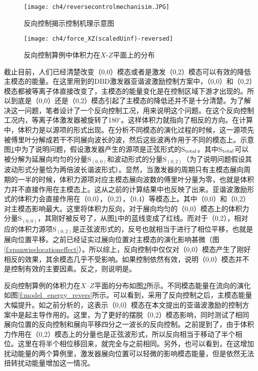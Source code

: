 \begin{figure}[htb]
  \centering
  \texttt{[image: ch4/reversecontrolmechanisim.JPG]}
  \caption{反向控制揭示控制机理示意图}\label{f:reversecontrolmechanisim}
\end{figure}
\begin{figure}[htb]
\centering
\texttt{[image: ch4/force\_XZ(scaledUinf)-reversed]}
\caption{反向控制算例中体积力在$X$-$Z$平面上的分布}%
\label{f:force_reversed}
\end{figure}

截止目前，人们已经清楚改变（0,0）模态\cite{dorr2016}或者是激发（0,2）模态\cite{Saric1998}可以有效的降低主模态的能量。在这里用到的DBD激发器亚谐波激励控制方案中，（0,0）和（0,2）模态都被等离子体直接改变了，主模态的能量变化是在控制区域下游才出现的。所以到底是（0,0）还是（0,2）模态引起了主模态的降低还并不是十分清楚。为了解决这一问题，笔者设计了一个反向控制工况，用来说明这个问题。在这个反向控制工况内，等离子体激发器被旋转了180$^\circ$。这样体积力就指向了相反的方向。在计算中，体积力是以源项的形式出现。在分析不同模态的演化过程的时候，这一源项先被傅里叶分解成若干不同展向波长的波，然后这些波再作用于不同的模态上。示意图\ref{f:reversecontrolmechanisim}中为了说明问题，假设激发器产生的源项是正弦形式的S$_{\rm total}$。其中S$_{\rm total}$可以被分解为延展向均匀的分量S$_{(0,0)}$和波动形式的分量S$_{(0,2)}$（为了说明问题假设其波动形式分量恰为两倍波长谐波形式）。显然，当激发器的周期只有主模态展向周期的一半的时候，体积力源项对应主模态展向波数的傅里叶分量为零，也就是体积力并不直接作用在主模态上。这从之前的计算结果中也反映了出来。亚谐波激励形式的体积力会直接作用在（0,0），（0,2），（0,4）等模态上。其中（0,0）和（0,2）对主模态影响最大。这里将体积力反向，对于展向均匀的（0,0）模态上的体积力分量S$_{(0,0)}$，其刚好被反号了，从图\ref{f:reversecontrolmechanisim}中的蓝线变成了红线。而对于（0,2），相对应的体积力源项S$_ {(0,2)}$是正弦波形式的，反号也就相当于进行了相位平移，也就是展向位置平移。之前已经证实过展向位置对主模态的演化影响甚微（图\ref{f:spanwiselocationeffect}）。所以综上，反向控制中仅仅对（0,0）模态产生了刚好相反的效果，其余模态几乎不受影响。如果控制依然有效，说明（0,0）模态并不是控制有效的主要因素。反之，则说明是。

反向控制算例的体积力在$X$--$Z$平面的分布如图\ref{f:force_reversed}所示。不同模态能量在流向的演化如图\ref{f:model_energy_revers}所示。可以看到，采用了反向控制之后，主模态能量大幅提升。如之前分析的，这表示（0,0）模态在本文提出的亚谐波激励的控制方案中是起主导作用的。这里，为了更好的摆脱（0,2）模态影响，同时测试了相同展向位置的反向控制和展向平移四分之一波长的反向控制。之前提到了，由于体积力作用在（0,2）模态上的分量也是正弦波形式，所以反向相当于移动了半个相位。这里在将半个相位移回来，就完全与之前相同。另外，也可以看到，在这增加扰动能量的两个算例里，激发器展向位置可以轻微的影响模态能量，但是依然无法扭转扰动能量增加这一情况。

